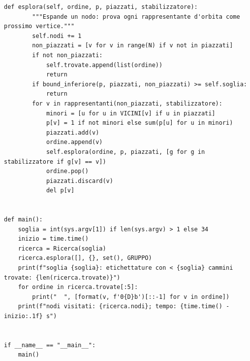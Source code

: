 \documentclass[11pt,a4paper]{article}
\begin{document}
\begin{lstlisting}[caption={certificati/q4\_branch\_and\_bound.py}]
    def esplora(self, ordine, p, piazzati, stabilizzatore):
        """Espande un nodo: prova ogni rappresentante d'orbita come prossimo vertice."""
        self.nodi += 1
        non_piazzati = [v for v in range(N) if v not in piazzati]
        if not non_piazzati:
            self.trovate.append(list(ordine))
            return
        if bound_inferiore(p, piazzati, non_piazzati) >= self.soglia:
            return
        for v in rappresentanti(non_piazzati, stabilizzatore):
            minori = [u for u in VICINI[v] if u in piazzati]
            p[v] = 1 if not minori else sum(p[u] for u in minori)
            piazzati.add(v)
            ordine.append(v)
            self.esplora(ordine, p, piazzati, [g for g in stabilizzatore if g[v] == v])
            ordine.pop()
            piazzati.discard(v)
            del p[v]


def main():
    soglia = int(sys.argv[1]) if len(sys.argv) > 1 else 34
    inizio = time.time()
    ricerca = Ricerca(soglia)
    ricerca.esplora([], {}, set(), GRUPPO)
    print(f"soglia {soglia}: etichettature con < {soglia} cammini trovate: {len(ricerca.trovate)}")
    for ordine in ricerca.trovate[:5]:
        print("  ", [format(v, f'0{D}b')[::-1] for v in ordine])
    print(f"nodi visitati: {ricerca.nodi}; tempo: {time.time() - inizio:.1f} s")


if __name__ == "__main__":
    main()

\end{lstlisting}
\end{document}
